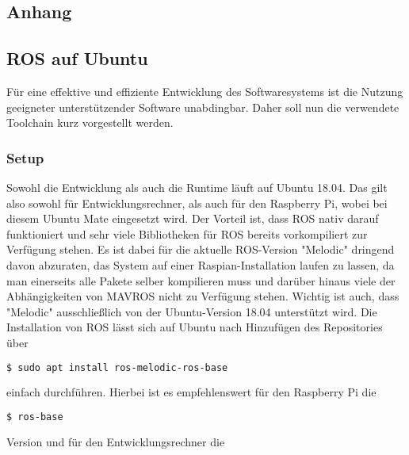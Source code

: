 
%
%
\begin{appendix}
\chapter*{Anhang}
\setcounter{chapter}{1}

\section{ROS auf Ubuntu}
Für eine effektive und effiziente Entwicklung des Softwaresystems ist die Nutzung geeigneter unterstützender Software unabdingbar. Daher soll nun die verwendete Toolchain kurz vorgestellt werden.
\subsection{Setup}
Sowohl die Entwicklung als auch die Runtime läuft auf Ubuntu 18.04. Das gilt also sowohl für Entwicklungsrechner, als auch für den Raspberry Pi, wobei bei diesem Ubuntu Mate eingesetzt wird. Der Vorteil ist, dass ROS nativ darauf funktioniert und sehr viele Bibliotheken für ROS bereits vorkompiliert zur Verfügung stehen. Es ist dabei für die aktuelle ROS-Version "Melodic" dringend davon abzuraten, das System auf einer Raspian-Installation laufen zu lassen, da man einerseits alle Pakete selber kompilieren muss und darüber hinaus viele der Abhängigkeiten von MAVROS nicht zu Verfügung stehen. Wichtig ist auch, dass "Melodic" ausschließlich von der Ubuntu-Version 18.04 unterstützt wird. Die Installation von ROS lässt sich auf Ubuntu nach Hinzufügen des Repositories über 

\begin{lstlisting}[language=bash]
$ sudo apt install ros-melodic-ros-base
\end{lstlisting}

einfach durchführen. Hierbei ist es empfehlenswert für den Raspberry Pi die 

\begin{lstlisting}[language=bash]
$ ros-base
\end{lstlisting}

Version und für den Entwicklungsrechner die 


\end{appendix}
